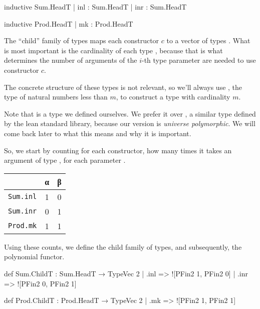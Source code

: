 \documentclass[titlepage]{report}
\newenvironment{remark}{%
\begin{framed}
\begin{trivlist}
    \item[\hskip \labelsep {\bfseries Remark:}]}%
{%
\end{trivlist}%
\end{framed}
}
\begin{document}
\begin{center}
    \begin{minipage}[t]{0.45\linewidth}
        \begin{leancode}
    inductive Sum.HeadT
      | inl : Sum.HeadT
      | inr : Sum.HeadT
        \end{leancode}
    \end{minipage}
    \begin{minipage}[t]{0.45\linewidth}
        \begin{leancode}    
    inductive Prod.HeadT
      | mk : Prod.HeadT
        \end{leancode}
    \end{minipage}
\end{center}

The ``child'' family of types maps each constructor $c$ to a vector of types .
What is most important is the cardinality of each type , 
because that is what determines the number of arguments of the $i$-th type parameter are needed
to use constructor $c$. 

The concrete structure of these types is not relevant, so we'll always use , the type
of natural numbers less than $m$, to construct a type with cardinality $m$.

\begin{remark}
    Note that  is a type we defined ourselves. We prefer it over , a similar
    type defined by the lean standard library, because our version is \emph{universe polymorphic}.
    We will come back later to what this means and why it is important.
\end{remark}

So, we start by counting for each constructor, how many times it takes an argument of type ,
for each parameter .
\begin{center}
\begin{tabular}{l|c|c}
    & α & β \\ \hline
    \texttt{Sum.inl}  & 1 & 0 \\
    \texttt{Sum.inr}  & 0 & 1 \\
    \texttt{Prod.mk}  & 1 & 1 \\    
\end{tabular}    
\end{center}

Using these counts, we define the child family of types, and subsequently, the polynomial functor.

\begin{center}
  \begin{leancode}
    def Sum.ChildT : Sum.HeadT → TypeVec 2
      | .inl => ![PFin2 1, PFin2 0]
      | .inr => ![PFin2 0, PFin2 1]

    def Prod.ChildT : Prod.HeadT → TypeVec 2
      | .mk  => ![PFin2 1, PFin2 1]
  \end{leancode}
\end{center}
\end{document}
